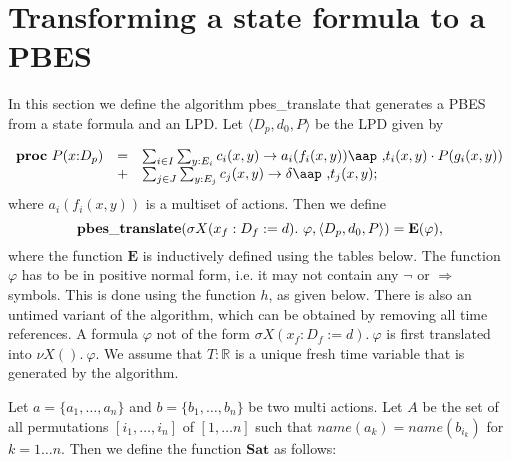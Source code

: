\documentclass{article}
\begin{document}
\section{Transforming a state formula to a PBES}

In this section we define the algorithm pbes\_translate that generates a
PBES from a state formula and an LPD. Let $\langle {D_p, d_0, P} \rangle $
be the LPD given by

\begin{equation*}
\begin{array}{lrl}
\mathbf{proc}~P(x{:}D_{p}) & = & \sum_{i\in
I}\sum_{y:E_{i}}c_{i}(x,y)\rightarrow a_{i}(f_{i}(x,y))\mbox{\aap ,}%
t_{i}(x,y)\cdot P(g_{i}(x,y)) \\ 
& + & \sum_{j\in J}\sum_{y:E_{j}}c_{j}(x,y)\rightarrow \delta \mbox{\aap ,}%
t_{j}(x,y);%
\end{array}%
\end{equation*}%
where $a_{i}(f_{i}(x,y))$ is a multiset of actions. Then we define 
\begin{equation*}
\mathbf{pbes\_translate}(\sigma X(x_{f}:D_{f}:=d).~\varphi ,\langle {%
D_{p},d_{0},P}\rangle )=\mathbf{E}(\varphi ),
\end{equation*}%
where the function $\mathbf{E}$ is inductively defined using the tables
below. The function $\varphi $ has to be in positive normal form, i.e. it
may not contain any $\lnot $ or $\Rightarrow $ symbols. This is done using
the function $h$, as given below. There is also an untimed variant of the
algorithm, which can be obtained by removing all time references. A formula $%
\varphi $ not of the form $\sigma X(x_{f}:D_{f}:=d).~\varphi $ is first
translated into $\nu X().~\varphi $. We assume that $T:\mathbb{R}$ is a
unique fresh time variable that is generated by the algorithm.

\vspace{1cm}

Let $a=\{a_{1},\ldots ,a_{n}\}$ and $b=\{b_{1},\ldots ,b_{n}\}$ be two multi
actions. Let $A$ be the set of all permutations $[i_{1},\ldots ,i_{n}]$ of $%
[1,\ldots n]$ such that $name(a_{k})=name(b_{i_{k}})$ for $k=1\ldots n$.
Then we define the function $\mathbf{Sat}$ as follows:
\end{document}
